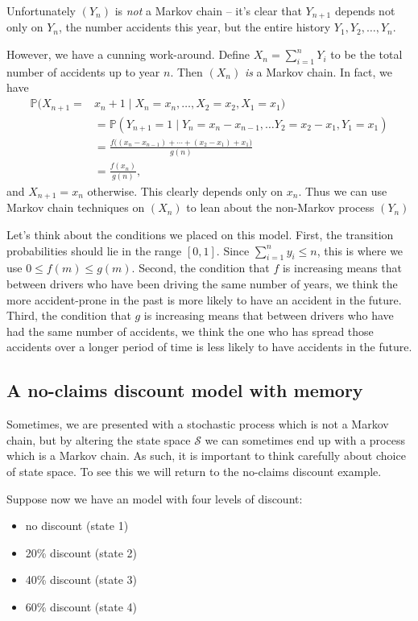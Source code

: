 \documentclass[
  a4paper,
]{article}
\providecommand{\tightlist}{%
  \setlength{\itemsep}{0pt}\setlength{\parskip}{0pt}}
\theoremstyle{definition}
\theoremstyle{definition}
\theoremstyle{definition}
\theoremstyle{remark}
\begin{document}
Unfortunately \((Y_n)\) is \emph{not} a Markov chain -- it's clear that \(Y_{n+1}\) depends not only on \(Y_n\), the number accidents this year, but the entire history \(Y_1, Y_2, \dots, Y_n\).

However, we have a cunning work-around. Define \(X_n=\sum_{i=1}^n Y_i\) to be the total number of accidents up to year \(n\). Then \((X_n)\) \emph{is} a Markov chain. In fact, we have
\begin{align*}
    \mathbb P(X_{n+1}={}&{}x_{n}+1\mid X_n=x_n, \dots, X_2=x_2, X_1=x_1)\\
    &=\mathbb P(Y_{n+1}=1\mid Y_n=x_n - x_{n-1}, \dots Y_2=x_2-x_1, Y_1=x_1)\\
    &=\frac{f\big((x_n-x_{n-1}) +\cdots +(x_2-x_1) + x_1\big)}{g(n)}\\
    &=\frac{f(x_n)}{g(n)},
\end{align*}
and \(X_{n+1} = x_n\) otherwise. This clearly depends only on \(x_n\). Thus we can use Markov chain techniques on \((X_n)\) to lean about the non-Markov process \((Y_n)\)

Let's think about the conditions we placed on this model. First, the transition probabilities should lie in the range \([0,1]\). Since \(\sum_{i=1}^n y_i\leq n\), this is where we use \(0\leq f(m)\leq g(m)\). Second, the condition that \(f\) is increasing means that between drivers who have been driving the same number of years, we think the more accident-prone in the past is more likely to have an accident in the future. Third, the condition that \(g\) is increasing means that between drivers who have had the same number of accidents, we think the one who has spread those accidents over a longer period of time is less likely to have accidents in the future.

\hypertarget{S06-example3}{%
\subsection{A no-claims discount model with memory}\label{S06-example3}}

Sometimes, we are presented with a stochastic process which is not a Markov chain, but by altering the state space \(\mathcal{S}\) we can sometimes end up with a process which is a Markov chain. As such, it is important to think carefully about choice of state space. To see this we will return to the no-claims discount example.

Suppose now we have an model with four levels of discount:

\begin{itemize}
\tightlist
\item
  no discount (state 1)
\item
  20\% discount (state 2)
\item
  40\% discount (state 3)
\item
  60\% discount (state 4)
\end{itemize}
\end{document}

